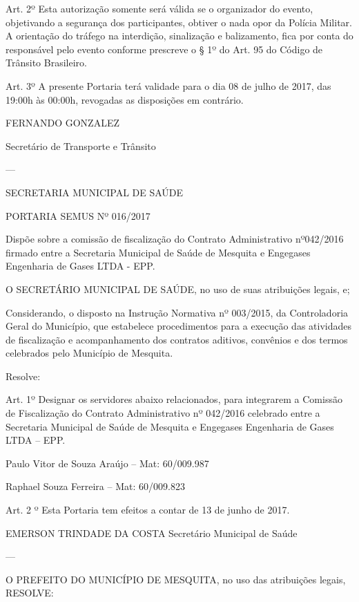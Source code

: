 \documentclass{doliberto}
\begin{document}
Art.  2º  Esta  autorização  somente  será  válida  se  o 
organizador  do  evento,  objetivando  a  segurança  dos 
participantes, obtiver o nada opor da Polícia Militar.  A 
orientação  do  tráfego  na  interdição,  sinalização  e 
balizamento, fica por conta do responsável pelo evento 
conforme  prescreve  o  §  1º  do  Art.  95  do  Código  de 
Trânsito Brasileiro.  
 
Art.  3º  A  presente  Portaria  terá  validade  para  o  dia  08  de 
julho  de  2017,  das  19:00h  às  00:00h,  revogadas  as 
disposições em contrário. 
 
 

FERNANDO GONZALEZ 

Secretário de Transporte e Trânsito 

---

SECRETARIA MUNICIPAL DE SAÚDE 

 

PORTARIA SEMUS Nº 016/2017 

  
Dispõe  sobre  a  comissão  de  fiscalização  do  Contrato 
Administrativo  nº042/2016  firmado  entre  a  Secretaria 
Municipal de Saúde de Mesquita e Engegases Engenharia de 
Gases LTDA - EPP. 
 
O  SECRETÁRIO  MUNICIPAL  DE  SAÚDE,  no  uso  de  suas 
atribuições legais, e; 
 
Considerando,  o  disposto  na  Instrução  Normativa  nº 
003/2015,  da  Controladoria  Geral  do  Município,  que 
estabelece  procedimentos  para  a  execução  das  atividades 
de  fiscalização  e  acompanhamento  dos  contratos  aditivos, 
convênios  e  dos  termos  celebrados  pelo  Município  de 
Mesquita. 
 
Resolve: 
 
Art.  1º  Designar  os  servidores  abaixo  relacionados,  para 
integrarem  a  Comissão  de  Fiscalização  do  Contrato 
Administrativo  nº  042/2016  celebrado  entre  a  Secretaria 
Municipal de Saúde de Mesquita e Engegases Engenharia de 
Gases LTDA – EPP. 
 
Paulo Vitor de Souza Araújo – Mat: 60/009.987 
 
Raphael Souza Ferreira – Mat: 60/009.823 
 
Art. 2 º Esta Portaria tem efeitos a contar de 13 de junho de 
2017. 
 

EMERSON TRINDADE DA COSTA 
Secretário Municipal de Saúde 


---

O PREFEITO DO MUNICÍPIO DE MESQUITA, no 
uso das atribuições legais,  
RESOLVE: 
 
\end{document}
